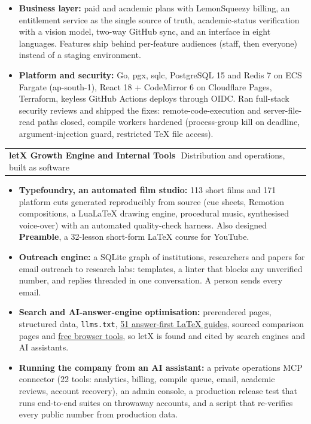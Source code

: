 \documentclass[10pt,a4paper]{article}
\makeatletter
\newcommand{\lnk}[2]{\href{#1}{\color{accent}#2}}
\newcommand{\proj}[3]{%
  \vspace{5pt}%
  \begin{tabularx}{\linewidth}{@{}X r@{}}
    {\sffamily\bfseries #1}\,{\small\color{muted}\textbar\ #2} & \small #3
  \end{tabularx}\par\vspace{-1pt}}
\makeatother
\begin{document}
\begin{itemize}
  \item \textbf{Business layer:} paid and academic plans with LemonSqueezy billing, an entitlement service as the single source
        of truth, academic-status verification with a vision model, two-way GitHub sync, and an interface in eight languages.
        Features ship behind per-feature audiences (staff, then everyone) instead of a staging environment.
  \item \textbf{Platform and security:} Go, pgx, sqlc, PostgreSQL 15 and Redis 7 on ECS Fargate (ap-south-1), React 18 +
        CodeMirror 6 on Cloudflare Pages, Terraform, keyless GitHub Actions deploys through OIDC. Ran full-stack security
        reviews and shipped the fixes: remote-code-execution and server-file-read paths closed, compile workers hardened
        (process-group kill on deadline, argument-injection guard, restricted TeX file access).
\end{itemize}

\proj{letX Growth Engine and Internal Tools}{Distribution and operations, built as software}{}
\begin{itemize}
  \item \textbf{Typefoundry, an automated film studio:} 113 short films and 171 platform cuts generated reproducibly from
        source (cue sheets, Remotion compositions, a LuaLaTeX drawing engine, procedural music, synthesised voice-over)
        with an automated quality-check harness. Also designed \textbf{Preamble}, a 32-lesson short-form LaTeX course for YouTube.
  \item \textbf{Outreach engine:} a SQLite graph of institutions, researchers and papers for email outreach to research labs:
        templates, a linter that blocks any unverified number, and replies threaded in one conversation. A person sends every email.
  \item \textbf{Search and AI-answer-engine optimisation:} prerendered pages, structured data, \texttt{llms.txt},
        \lnk{https://letx.app/learn/problems/}{51 answer-first LaTeX guides}, sourced comparison pages and
        \lnk{https://letx.app/tools/}{free browser tools}, so letX is found and cited by search engines and AI assistants.
  \item \textbf{Running the company from an AI assistant:} a private operations MCP connector (22 tools: analytics, billing,
        compile queue, email, academic reviews, account recovery), an admin console, a production release test that runs
        end-to-end suites on throwaway accounts, and a script that re-verifies every public number from production data.
\end{itemize}
\end{document}

